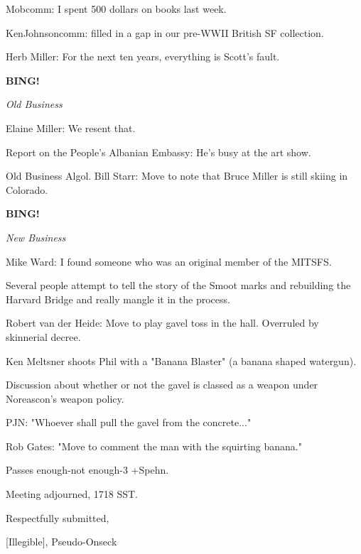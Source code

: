 \documentclass[12pt]{article}
\newcommand{\bing}{{\bf BING!} }
\newcommand{\goto}[1]{\bing \vskip 12pt \centerline{{\em{#1}}}}
\begin{document}
Mobcomm: I spent 500 dollars on books last week.

KenJohnsoncomm: filled in a gap in our pre-WWII British SF collection.

Herb Miller: For the next ten years, everything is Scott's fault.

\goto{Old Business}

Elaine Miller: We resent that.

Report on the People's Albanian Embassy: He's busy at the art show.

Old Business Algol. Bill Starr: Move to note that Bruce Miller is still skiing in Colorado.

\goto{New Business}

Mike Ward: I found someone who was an original member of the MITSFS.

Several people attempt to tell the story of the Smoot marks and rebuilding the Harvard Bridge and really mangle it in the process.

Robert van der Heide: Move to play gavel toss in the hall. Overruled by skinnerial decree.

Ken Meltsner shoots Phil with a "Banana Blaster" (a banana shaped watergun).

Discussion about whether or not the gavel is classed as a weapon under Noreascon's weapon policy.

PJN: "Whoever shall pull the gavel from the concrete..."

Rob Gates: "Move to comment the man with the squirting banana."

Passes enough-not enough-3 +Spehn.

\vspace{12pt}

\noindent
Meeting adjourned, 1718 SST.

\vspace{18pt}

\centerline{Respectfully submitted,}
\centerline{[Illegible], Pseudo-Onseck}
\end{document}
